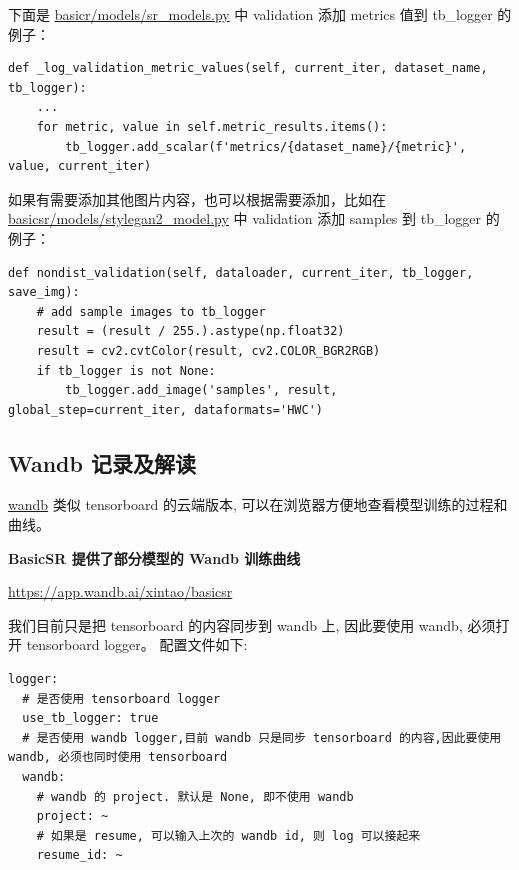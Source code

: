 \documentclass[../main.tex]{subfiles}
\begin{document}
下面是 \href{https://github.com/XPixelGroup/BasicSR/blob/master/basicsr/models/sr_model.py}{basicr/models/sr\_models.py} 中 validation 添加 metrics 值到 tb\_logger 的例子：

\begin{verbatim}
def _log_validation_metric_values(self, current_iter, dataset_name, tb_logger):
    ...
    for metric, value in self.metric_results.items():
        tb_logger.add_scalar(f'metrics/{dataset_name}/{metric}', value, current_iter)
\end{verbatim}

如果有需要添加其他图片内容，也可以根据需要添加，比如在 \href{https://github.com/XPixelGroup/BasicSR/blob/master/basicsr/models/stylegan2_model.py}{basicsr/models/stylegan2\_model.py} 中 validation 添加 samples 到 tb\_logger 的例子：

\begin{verbatim}
def nondist_validation(self, dataloader, current_iter, tb_logger, save_img):
    # add sample images to tb_logger
    result = (result / 255.).astype(np.float32)
    result = cv2.cvtColor(result, cv2.COLOR_BGR2RGB)
    if tb_logger is not None:
        tb_logger.add_image('samples', result, global_step=current_iter, dataformats='HWC')
\end{verbatim}

\subsection{Wandb 记录及解读}\label{code_structure:wandb_record}

\href{https://www.wandb.com/}{wandb} 类似 tensorboard 的云端版本, 可以在浏览器方便地查看模型训练的过程和曲线。

\begin{note} %
    \textbf{BasicSR 提供了部分模型的 Wandb 训练曲线}

    \href{https://app.wandb.ai/xintao/basicsr}{https://app.wandb.ai/xintao/basicsr}
\end{note}

我们目前只是把 tensorboard 的内容同步到 wandb 上, 因此要使用 wandb, 必须打开 tensorboard logger。
配置文件如下:

\begin{verbatim}
logger:
  # 是否使用 tensorboard logger
  use_tb_logger: true
  # 是否使用 wandb logger,目前 wandb 只是同步 tensorboard 的内容,因此要使用 wandb, 必须也同时使用 tensorboard
  wandb:
    # wandb 的 project. 默认是 None, 即不使用 wandb
    project: ~
    # 如果是 resume, 可以输入上次的 wandb id, 则 log 可以接起来
    resume_id: ~
\end{verbatim}
\end{document}
